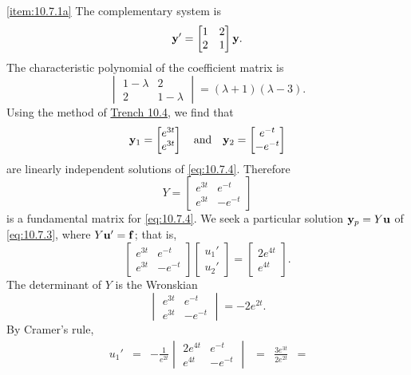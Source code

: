 \documentclass{ximera}
\begin{document}
\begin{example}
\begin{explanation}
\ref{item:10.7.1a} The complementary system is
\begin{equation} \label{eq:10.7.4}
{\bf y}'=\begin{bmatrix}1&2\\2&1\end{bmatrix}{\bf y}.
\end{equation}
The characteristic polynomial of the coefficient matrix is
$$
\begin{vmatrix}1-\lambda&2\\2&1-\lambda\end{vmatrix}=
(\lambda+1)(\lambda-3).
$$
Using the method of \href{https://ximera.osu.edu/ode/main/constCoeffHomSysI/constCoeffHomSysI}{Trench 10.4}, we find that
$$
{\bf y}_1=\begin{bmatrix}e^{3t}\\e^{3t}\end{bmatrix}
\quad\mbox{and}\quad
{\bf y}_2=\begin{bmatrix}e^{-t}\\-e^{-t}\end{bmatrix}
$$
are linearly independent solutions of \eqref{eq:10.7.4}.
Therefore
$$
Y=\begin{bmatrix}e^{3t}&e^{-t}\\e^{3t}&-e^{-t}\end{bmatrix}
$$
is a fundamental matrix for \eqref{eq:10.7.4}. We seek a particular
solution ${\bf y}_p=Y{\bf u}$ of \eqref{eq:10.7.3}, where $Y{\bf u}'={\bf f}$; that is,
$$
\begin{bmatrix}e^{3t}&e^{-t}\\e^{3t}&-e^{-t}\end{bmatrix}
\begin{bmatrix}u_1'\\u_2'\end{bmatrix}
=\begin{bmatrix}2e^{4t}\\e^{4t}\end{bmatrix}.
$$
The determinant of $Y$ is the Wronskian
$$
\begin{vmatrix}e^{3t}&e^{-t}\\e^{3t}&-e^{-t}\end{vmatrix}
=-2e^{2t}.
$$
By Cramer's rule,
$$
\begin{array}{ccccccl}
u_1'&=&-\frac{1}{e^{2t}}
\begin{vmatrix}2e^{4t}&e^{-t}\\e^{4t}&-e^{-t}
\end{vmatrix}&=&\frac{3e^{3t}}{2e^{2t}}&=

\end{array}$$
\end{explanation}
\end{example}
\end{document}
